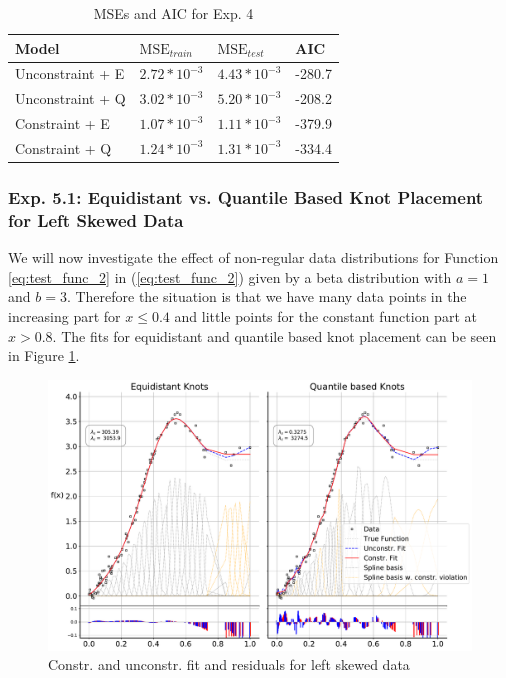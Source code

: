 \documentclass[10pt,a4paper]{article}
\begin{document}
\begin{table}[h]
	\centering
	\begin{tabular}{|l|l|l|l|}
		\hline
		\textbf{Model} & \textbf{$\text{MSE}_{train}$} & \textbf{$\text{MSE}_{test}$}  & \textbf{AIC} \\ \hline \toprule
		Unconstraint + E  & $2.72 * 10^{-3}$  & $4.43 * 10^{-3}$ & -280.7       \\ \hline
		Unconstraint + Q  & $3.02 * 10^{-3}$  & $5.20 * 10^{-3}$ & -208.2       \\ \hline
		Constraint + E    & $1.07 * 10^{-3}$  & $1.11 * 10^{-3}$ & -379.9       \\ \hline
		Constraint + Q    & $1.24 * 10^{-3}$  & $1.31 * 10^{-3}$ & -334.4       \\ \hline \bottomrule
	\end{tabular}
	\caption{MSEs and AIC for Exp. 4}
	\label{tab:metrics_4}
\end{table}


\subsubsection{Exp. 5.1: Equidistant vs. Quantile Based Knot Placement for Left Skewed Data} \label{subsubsec:left_skew}

We will now investigate the effect of non-regular data distributions for Function \ref{eq:test_func_2} in (\ref{eq:test_func_2}) given by a beta distribution with $a = 1$ and $b = 3$. Therefore the situation is that we have many data points in the increasing part for $x \le 0.4$ and little points for the constant function part at $x > 0.8$. The fits for equidistant and quantile based knot placement can be seen in Figure \ref{fig:fit_left_skew_250}. 

\begin{figure}[H]
	\centering
	\includegraphics[width=\columnwidth]{../thesisplots/exp_beta/exp_left_skewed_data_ndata_250_rseed_1.pdf}
	\caption{Constr. and unconstr. fit and residuals for left skewed data}
	\label{fig:fit_left_skew_250}
\end{figure}
\end{document}

